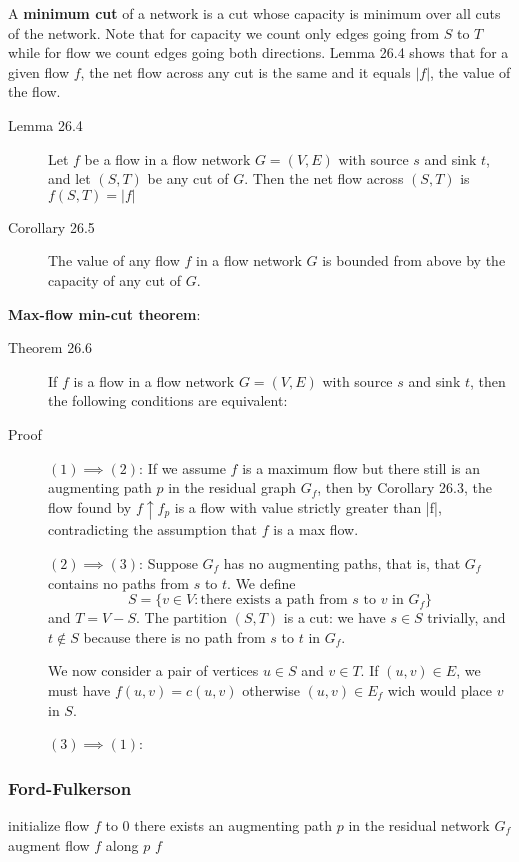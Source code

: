 A \textbf{minimum cut} of a network is a cut whose capacity is minimum over all
cuts of the network. Note that for capacity we count only edges going from $S$
to $T$ while for flow we count edges going both directions.  Lemma 26.4 shows
that for a given flow $f$, the net flow across any cut is the same and it equals
$|f|$, the value of the flow.

\begin{description}
\item[Lemma 26.4] Let $f$ be a flow in a flow network $G = (V,E)$ with source
  $s$ and sink $t$, and let $(S,T)$ be any cut of $G$. Then the net flow across
  $(S,T)$ is $f(S,T) = |f|$

\item[Corollary 26.5] The value of any flow $f$ in a flow network $G$ is bounded
  from above by the capacity of any cut of $G$.
\end{description}

\noindent \textbf{Max-flow min-cut theorem}:
\begin{description}
\item[Theorem 26.6] If $f$ is a flow in a flow network $G = (V,E)$ with source
  $s$ and sink $t$, then the following conditions are equivalent:

\item[Proof] $(1) \implies (2)$: If we assume $f$ is a maximum flow but there
  still is an augmenting path $p$ in the residual graph $G_f$, then by Corollary
  26.3, the flow found by $f\uparrow f_p$ is a flow with value strictly greater
  than |f|, contradicting the assumption that $f$ is a max flow.

  $(2) \implies (3)$: Suppose $G_f$ has no augmenting paths, that is, that $G_f$
  contains no paths from $s$ to $t$. We define
  \[
    S = \{v\in V : \text{there exists a path from $s$ to $v$ in $G_f$}\}
  \]
  and $T = V - S$. The partition $(S,T)$ is a cut: we have $s\in S$ trivially,
  and $t\notin S$ because there is no path from $s$ to $t$ in $G_f$.

  We now consider a pair of vertices $u\in S$ and $v \in T$. If $(u,v)\in E$, we
  must have $f(u,v) = c(u,v)$ otherwise $(u,v)\in E_f$ wich would place $v$ in
  $S$.


  $(3) \implies (1)$:
\end{description}


\subsubsection{Ford-Fulkerson}
\begin{codebox}
\li initialize flow $f$ to 0
\li \While there exists an augmenting path $p$ in the residual network $G_f$
    \Do
\li      augment flow $f$ along $p$
    \End
\li \Return $f$
\end{codebox}